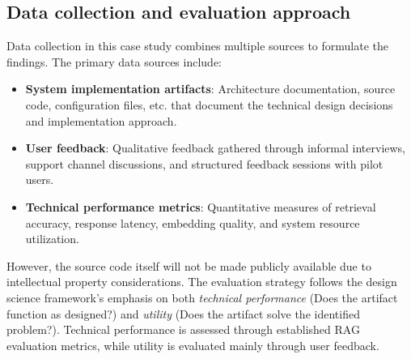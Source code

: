 \subsection{Data collection and evaluation approach}
\label{subsec:data-collection}

Data collection in this case study combines multiple sources to formulate the findings. The primary data sources include:

\begin{itemize}
    \item \textbf{System implementation artifacts}: Architecture documentation, source code, configuration files, etc. that document the technical design decisions and implementation approach.
    \item \textbf{User feedback}: Qualitative feedback gathered through informal interviews, support channel discussions, and structured feedback sessions with pilot users.
    \item \textbf{Technical performance metrics}: Quantitative measures of retrieval accuracy, response latency, embedding quality, and system resource utilization.
\end{itemize}

However, the source code itself will not be made publicly available due to intellectual property considerations. The evaluation strategy follows the design science framework's emphasis on both \emph{technical performance} (Does the artifact function as designed?) and \emph{utility} (Does the artifact solve the identified problem?). Technical performance is assessed through established RAG evaluation metrics, while utility is evaluated mainly through user feedback.
